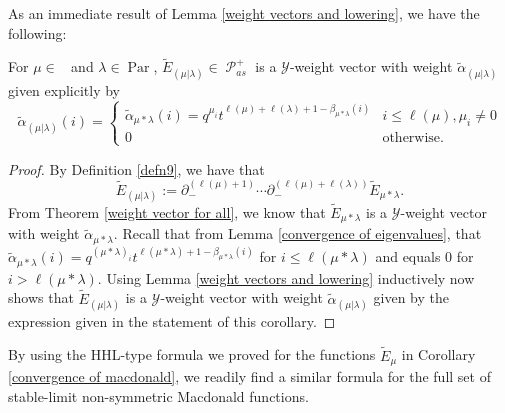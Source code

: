 \documentclass[ALCO,Unicode]{cedram}
\newcommand{\y}{{ \mathscr{Y} }}
\DeclareMathOperator{\sP}{\mathscr{P} }
\DeclareMathOperator{\Par}{\mathrm{Par}}
\DeclareMathOperator{\Compred}{\mathrm{Comp}^{\textit{red}}}
\begin{document}
As an immediate result of Lemma \ref{weight vectors and lowering}, we have the following:
\begin{coro}\label{stable macdonald are weight vectors}
    For $\mu \in \Compred$ and $\lambda \in \Par$,  $\widetilde{E}_{(\mu|\lambda)} \in \sP_{as}^{+}$ is a $\y$-weight vector with weight $\widetilde{\alpha}_{(\mu|\lambda)}$ given explicitly by
\begin{equation}
    \widetilde{\alpha}_{(\mu|\lambda)}(i) = 
    \begin{cases}
    \widetilde{\alpha}_{\mu*\lambda}(i) = q^{\mu_i}t^{\ell(\mu)+\ell(\lambda)+1-\beta_{\mu*\lambda}(i)} & i\leq \ell(\mu) , \mu_i \neq 0 \\
    0 & \text{otherwise}.
     \end{cases}
\end{equation}
\end{coro}
\begin{proof}
   By Definition \ref{defn9}, we have that $$\widetilde{E}_{(\mu|\lambda)} :=  \partial_{-}^{(\ell(\mu)+1)}\cdots \partial_{-}^{(\ell(\mu)+\ell(
\lambda))} \widetilde{E}_{\mu*\lambda}. $$
From Theorem \ref{weight vector for all}, we know that $\widetilde{E}_{\mu*\lambda}$ is a $\y$-weight vector with weight $\widetilde{\alpha}_{\mu*\lambda}.$ Recall that from Lemma \ref{convergence of eigenvalues}, that $\widetilde{\alpha}_{\mu*\lambda}(i) = q^{(\mu*\lambda)_i}t^{\ell(\mu*\lambda)+1-\beta_{\mu*\lambda}(i)}$ for $i \leq \ell(\mu*\lambda)$ and equals $0$ for $i > \ell(\mu*\lambda).$ Using Lemma \ref{weight vectors and lowering} inductively now shows that $\widetilde{E}_{(\mu|\lambda)}$ is a $\y$-weight vector with weight $\widetilde{\alpha}_{(\mu|\lambda)}$ given by the expression given in the statement of this corollary. 
\end{proof}

By using the HHL-type formula we proved for the functions $\widetilde{E}_{\mu}$ in Corollary \ref{convergence of macdonald}, we readily find a similar formula for the full set of stable-limit non-symmetric Macdonald functions. 
\end{document}
